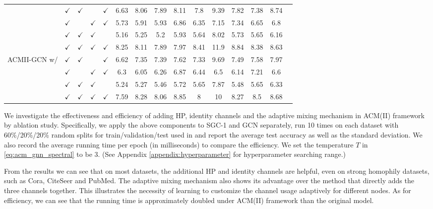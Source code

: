 \documentclass{article}
\newcommand{\0}{{\boldsymbol{0}}}
\newcommand{\6}{{\partial}}
\newcommand{\8}{{\infty}}
\newcommand{\4}{{\nabla}}
\begin{document}
\begin{table}[htbp]
\begin{tabular}{c|cccc|ccccccccc|r}
          & $\checkmark$ & $\checkmark$ &       & $\checkmark$ & 6.63  & 8.06  & 7.89  & 8.11  & 7.8   & 9.39  & 7.82  & 7.38  & 8.74  &  \\
          & $\checkmark$ &       & $\checkmark$ & $\checkmark$ & 5.73  & 5.91  & 5.93  & 6.86  & 6.35  & 7.15  & 7.34  & 6.65  & 6.8   &  \\
          & $\checkmark$ & $\checkmark$ & $\checkmark$ &       & 5.16  & 5.25  & 5.2   & 5.93  & 5.64  & 8.02  & 5.73  & 5.65  & 6.16  &  \\
          & $\checkmark$ & $\checkmark$ & $\checkmark$ & $\checkmark$ & 8.25  & 8.11  & 7.89  & 7.97  & 8.41  & 11.9  & 8.84  & 8.38  & 8.63  &  \\
\cmidrule{1-14}    \multicolumn{1}{c|}{\multirow{4}[2]{*}{ACMII-GCN w/}} & $\checkmark$ & $\checkmark$ &       & $\checkmark$ & 6.62  & 7.35  & 7.39  & 7.62  & 7.33  & 9.69  & 7.49  & 7.58  & 7.97  &  \\
          & $\checkmark$ &       & $\checkmark$ & $\checkmark$ & 6.3   & 6.05  & 6.26  & 6.87  & 6.44  & 6.5   & 6.14  & 7.21  & 6.6   &  \\
          & $\checkmark$ & $\checkmark$ & $\checkmark$ &       & 5.24  & 5.27  & 5.46  & 5.72  & 5.65  & 7.87  & 5.48  & 5.65  & 6.33  &  \\
          & $\checkmark$ & $\checkmark$ & $\checkmark$ & $\checkmark$ & 7.59  & 8.28  & 8.06  & 8.85  & 8     & 10    & 8.27  & 8.5   & 8.68  &  \\
    \bottomrule
    \bottomrule
    \end{tabular}\end{table}

%
 We investigate the effectiveness and efficiency of adding HP, identity channels and the adaptive mixing mechanism in ACM(II) framework by ablation study. Specifically, we apply the above components to SGC-1 and GCN separately, run 10 times on each dataset with 60\%/20\%/20\% random splits for train/validation/test used in \cite{chien2021adaptive} and report the average test accuracy as well as the standard deviation. We also record the average running time per epoch (in milliseconds) to compare the efficiency. We set the temperature $T$ in \eqref{eq:acm_gnn_spectral} to be $3$. (See Appendix \ref{appendix:hyperparameter} for hyperparameter searching range.)

From the results we can see that on most datasets, the additional HP and identity channels are helpful, even on strong homophily datasets, such as Cora, CiteSeer and PubMed. The adaptive mixing mechanism also shows its advantage over the method that directly adds the three channels together. This illustrates the necessity of learning to customize the channel usage adaptively for different nodes. As for efficiency, we can see that the running time is approximately doubled under ACM(II) framework than the original model.
\end{document}
